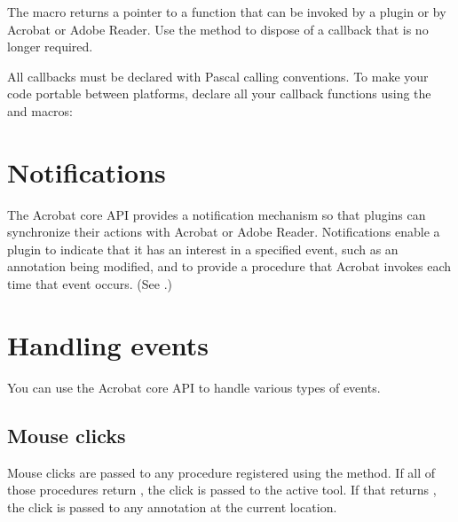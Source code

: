 \documentclass[letterpaper,12pt,english,openany,oneside]{sphinxmanual}
\begin{document}
The  macro returns a pointer to a function that can be invoked by a plugin or by Acrobat or Adobe Reader. Use the  method to dispose of a callback that is no longer required.

All callbacks must be declared with Pascal calling conventions. To make your code portable between platforms, declare all your callback functions using the  and  macros:

\begin{sphinxVerbatim}[commandchars=\\\{\}]
      
\end{sphinxVerbatim}


\section{Notifications}
\label{\detokenize{Plugins_Pimech:notifications}}
The Acrobat core API provides a notification mechanism so that plugins can synchronize their actions with Acrobat or Adobe Reader. Notifications enable a plugin to indicate that it has an interest in a specified event, such as an annotation being modified, and to provide a procedure that Acrobat invokes each time that event occurs. (See .)


\section{Handling events}
\label{\detokenize{Plugins_Pimech:handling-events}}
You can use the Acrobat core API to handle various types of events.


\subsection{Mouse clicks}
\label{\detokenize{Plugins_Pimech:mouse-clicks}}
Mouse clicks are passed to any procedure registered using the  method. If all of those procedures return , the click is passed to the active tool. If that returns , the click is passed to any annotation at the current location.
\end{document}
